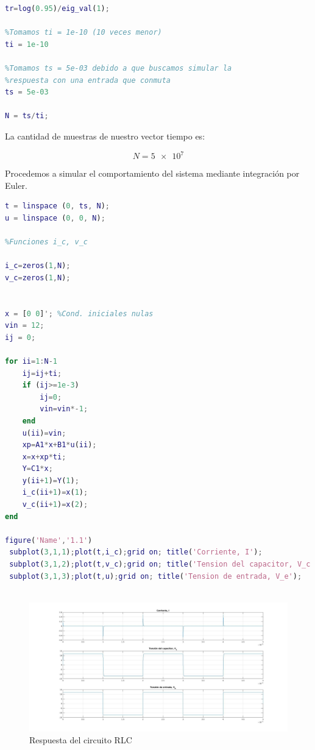 \documentclass{article}
\begin{document}
\begin{lstlisting}[language=matlab]
%% Tiempo de integracion y simulacion
tr=log(0.95)/eig_val(1);

%Tomamos ti = 1e-10 (10 veces menor)
ti = 1e-10

%Tomamos ts = 5e-03 debido a que buscamos simular la 
%respuesta con una entrada que conmuta
ts = 5e-03 

N = ts/ti;
\end{lstlisting}

La cantidad de muestras de nuestro vector tiempo es:

$$N=\num{5e7}$$

Procedemos a simular el comportamiento del sistema mediante integración por Euler.

\begin{lstlisting}[language=matlab]
  %% Entrada y vector de tiempo
t = linspace (0, ts, N);
u = linspace (0, 0, N);

%Funciones i_c, v_c 

i_c=zeros(1,N);
v_c=zeros(1,N);


x = [0 0]'; %Cond. iniciales nulas
vin = 12;
ij = 0;

for ii=1:N-1
    ij=ij+ti;
    if (ij>=1e-3)
        ij=0;
        vin=vin*-1;
    end
    u(ii)=vin;
    xp=A1*x+B1*u(ii);
    x=x+xp*ti;
    Y=C1*x;
    y(ii+1)=Y(1);
    i_c(ii+1)=x(1);
    v_c(ii+1)=x(2);
end

figure('Name','1.1')
 subplot(3,1,1);plot(t,i_c);grid on; title('Corriente, I'); 
 subplot(3,1,2);plot(t,v_c);grid on; title('Tension del capacitor, V_c');
 subplot(3,1,3);plot(t,u);grid on; title('Tension de entrada, V_e');
 
\end{lstlisting}

\begin{figure}[!h]
  \centering
  \includegraphics[width=1\textwidth]{img/rlc1-1.jpg}
  \caption{Respuesta del circuito RLC}
\end{figure}
\end{document}
